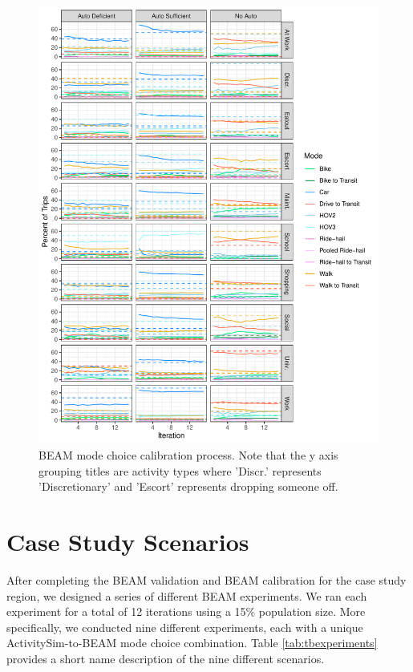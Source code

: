 \documentclass[fancy, masters]{byuthesis}
\begin{document}
\begin{figure}
\includegraphics{thesis_files/figure-latex/fig-beam-calib-1} \caption[BEAM mode choice calibration process.]{BEAM mode choice calibration process. Note that the y axis grouping titles are activity types where 'Discr.' represents 'Discretionary' and 'Escort' represents dropping someone off.}\label{fig:fig-beam-calib}
\end{figure}

\hypertarget{meth-scenarios}{%
\section{Case Study Scenarios}\label{meth-scenarios}}

After completing the BEAM validation and BEAM calibration for the case study region, we designed a series of different BEAM experiments. We ran each experiment for a total of 12 iterations using a 15\% population size. More specifically, we conducted nine different experiments, each with a unique ActivitySim-to-BEAM mode choice combination. Table \ref{tab:tbexperiments} provides a short name description of the nine different scenarios.
\end{document}
